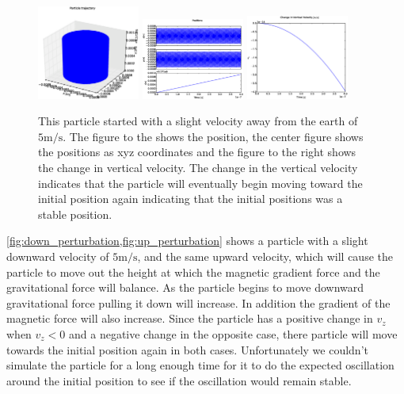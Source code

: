 \documentclass[x11names]{article}
\begin{document}
  \begin{figure}
      \centering
      \includegraphics[width = 0.30\textwidth]{figures/6-5/3Dplot}
      \includegraphics[width = 0.30\textwidth]{figures/6-5/xyz}
      \includegraphics[width = 0.30\textwidth]{figures/6-5/vertical_vel}
      \caption{ This particle started with a slight velocity away from the earth of \(5 \si{\meter\per\second}\). The figure to the shows the position, the center figure shows the positions as xyz coordinates and the figure to the right shows the change in vertical velocity. The change in the vertical velocity indicates that the particle will eventually begin moving toward the initial position again indicating that the initial positions was a stable position.}
      \label{fig:up_perturbation}
   \end{figure}

  \cref{fig:down_perturbation,fig:up_perturbation} shows a particle with a slight downward velocity of \(5 \si{\meter\per\second}\), and the same upward velocity, which will cause the particle to move out the height at which the magnetic gradient force and the gravitational force will balance. As the particle begins to move downward gravitational force pulling it down will increase. In addition the gradient of the magnetic force will also increase. Since the particle has a positive change in \(v_z\) when \(v_z < 0\) and a negative change in the opposite case, there particle will move towards the initial position again in both cases. Unfortunately we couldn't simulate the particle for a long enough time for it to do the expected oscillation around the initial position to see if the oscillation would remain stable.
\end{document}
